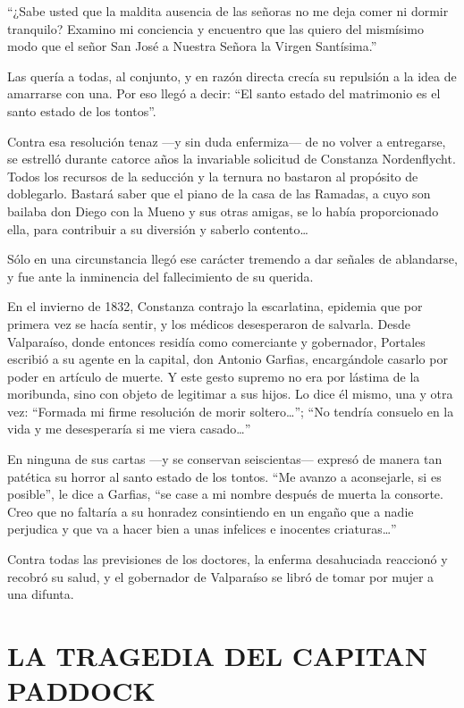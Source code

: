 \documentclass[10pt,twoside,openright]{memoir}
\begin{document}
``¿Sabe usted que la maldita ausencia de las señoras no me deja comer ni
dormir tranquilo? Examino mi conciencia y encuentro que las quiero del
mismísimo modo que el señor San José a Nuestra Señora la Virgen
Santísima.''

Las quería a todas, al conjunto, y en razón directa crecía su repulsión
a la idea de amarrarse con una. Por eso llegó a decir: ``El santo estado
del matrimonio es el santo estado de los tontos''.

Contra esa resolución tenaz ---y sin duda enfermiza--- de no volver a
entregarse, se estrelló durante catorce años la invariable solicitud de
Constanza Nordenflycht. Todos los recursos de la seducción y la ternura
no bastaron al propósito de doblegarlo. Bastará saber que el piano de la
casa de las Ramadas, a cuyo son bailaba don Diego con la Mueno y sus
otras amigas, se lo había proporcionado ella, para contribuir a su
diversión y saberlo contento\ldots{}

Sólo en una circunstancia llegó ese carácter tremendo a dar señales de
ablandarse, y fue ante la inminencia del fallecimiento de su querida.

En el invierno de 1832, Constanza contrajo la escarlatina, epidemia que
por primera vez se hacía sentir, y los médicos desesperaron de salvarla.
Desde Valparaíso, donde entonces residía como comerciante y gobernador,
Portales escribió a su agente en la capital, don Antonio Garfias,
encargándole casarlo por poder en artículo de muerte. Y este gesto
supremo no era por lástima de la moribunda, sino con objeto de legitimar
a sus hijos. Lo dice él mismo, una y otra vez: ``Formada mi firme
resolución de morir soltero\ldots ''; ``No tendría consuelo en la vida y me
desesperaría si me viera casado\ldots''

En ninguna de sus cartas ---y se conservan seiscientas--- expresó de
manera tan patética su horror al santo estado de los tontos. ``Me avanzo
a aconsejarle, si es posible'', le dice a Garfias, ``se case a mi
 nombre después de muerta la
consorte. Creo que no faltaría a su honradez consintiendo en un engaño
que a nadie perjudica y que va a
hacer bien a unas infelices e inocentes criaturas\ldots''

Contra todas las previsiones de los doctores, la
enferma desahuciada reaccionó y
recobró su salud, y el gobernador de Valparaíso se libró de tomar por
mujer a una difunta.

\chapter{LA TRAGEDIA DEL CAPITAN PADDOCK}
\end{document}
